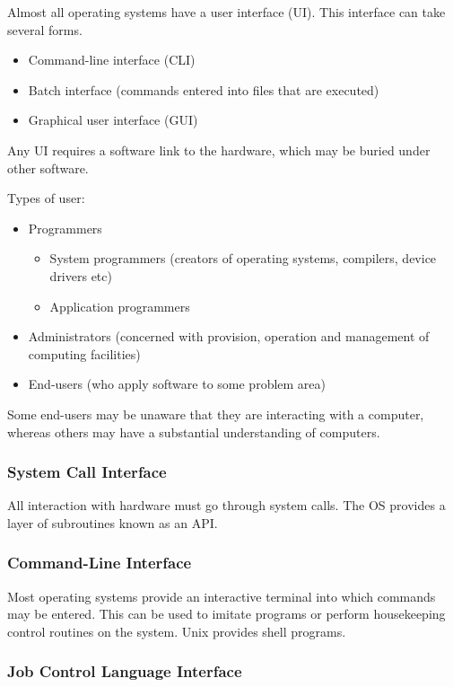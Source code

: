 {Almost all operating systems have a user interface (UI).
This interface can take several forms.
\begin{itemize}
  \item Command-line interface (CLI)
  \item Batch interface (commands entered into files that are executed)
  \item Graphical user interface (GUI)
\end{itemize}

Any UI requires a software link to the hardware, which may be buried under other software.

Types of user:
\begin{itemize}
  \item Programmers
  \begin{itemize}
    \item System programmers (creators of operating systems, compilers, device drivers etc)
    \item Application programmers
  \end{itemize}
  \item Administrators (concerned with provision, operation and management of computing facilities)
  \item End-users (who apply software to some problem area)
\end{itemize}

Some end-users may be unaware that they are interacting with a computer, whereas others may have a substantial understanding of computers.

\subsubsection{System Call Interface}

All interaction with hardware must go through system calls.
The OS provides a layer of subroutines known as an API.

\subsubsection{Command-Line Interface}

Most operating systems provide an interactive terminal into which commands may be entered.
This can be used to imitate programs or perform housekeeping control routines on the system.
Unix provides shell programs.

\subsubsection{Job Control Language Interface}

}
